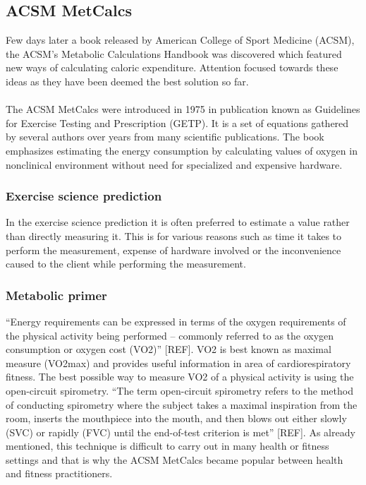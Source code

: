 \documentclass[12pt, a4paper]{report}   %
\begin{document}
\begin{enumerate}
\clearpage
\subsection{ACSM MetCalcs}
Few days later a book released by American College of Sport Medicine (ACSM), the ACSM\textsf{'}s Metabolic Calculations Handbook was discovered which featured new ways of calculating caloric expenditure. Attention focused towards these ideas as they have been deemed the best solution so far.
\\ \\
The ACSM MetCalcs were introduced in 1975 in publication known as Guidelines for Exercise Testing and Prescription (GETP). It is a set of equations gathered by several authors over years from many scientific publications. The book emphasizes estimating the energy consumption by calculating values of oxygen in nonclinical environment without need for specialized and expensive hardware.

\subsubsection{Exercise science prediction}
In the exercise science prediction it is often preferred to estimate a value rather than directly measuring it. This is for various reasons such as time it takes to perform the measurement, expense of hardware involved or the inconvenience caused to the client while performing the measurement.

\subsubsection{Metabolic primer}
“Energy requirements can be expressed in terms of the oxygen requirements of the physical activity being performed – commonly referred to as the oxygen consumption or oxygen cost (VO2)” [REF]. VO2 is best known as maximal measure (VO2max) and provides useful information in area of cardiorespiratory fitness. The best possible way to measure VO2 of a physical activity is using the open-circuit spirometry. “The term open-circuit spirometry refers to the method of conducting spirometry where the subject takes a maximal inspiration from the room, inserts the mouthpiece into the mouth, and then blows out either slowly (SVC) or rapidly (FVC) until the end-of-test criterion is met” [REF]. As already mentioned, this technique is difficult to carry out in many health or fitness settings and that is why the ACSM MetCalcs became popular between health and fitness practitioners.


\end{enumerate}
\end{document}
